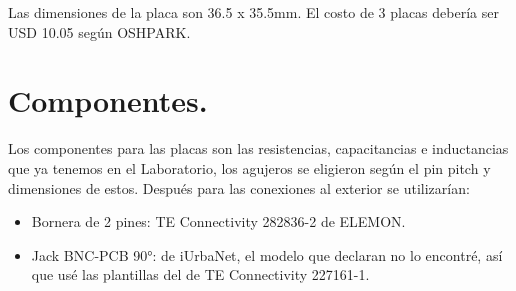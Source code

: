 Las dimensiones de la placa son 36.5 x 35.5mm. El costo de 3 placas debería ser USD 10.05 según OSHPARK. %

\section{Componentes.}
Los componentes para las placas son las resistencias, capacitancias e inductancias que ya tenemos en el Laboratorio, los agujeros se eligieron según el pin pitch y dimensiones de estos. Después para las conexiones al exterior se utilizarían:

\begin{itemize}
	\item Bornera de 2 pines: TE Connectivity 282836-2 de ELEMON.
	\item Jack BNC-PCB 90°: de iUrbaNet, el modelo que declaran no lo encontré, así que usé las plantillas del de TE Connectivity 227161-1.
\end{itemize}
